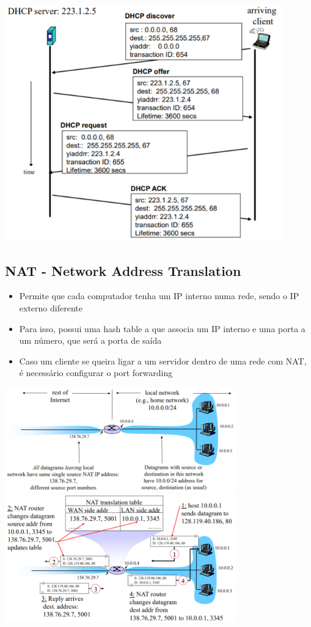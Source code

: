 \documentclass[../resumosRCOM.tex]{subfiles}
\begin{document}
\begin{center}
    \includegraphics[width=12cm]{images/RCOM26.png}
\end{center}

\subsection{NAT - Network Address Translation}
\begin{itemize}
    \item Permite que cada computador tenha um IP interno numa rede, sendo o IP externo diferente
    \item Para isso, possui uma hash table a que associa um IP interno e uma porta a um número, que será a porta de saída
    \item Caso um cliente se queira ligar a um servidor dentro de uma rede com NAT, é necessário configurar o port forwarding

\end{itemize}
\begin{center}
    \includegraphics[width=10cm]{images/RCOM27.png}
    \includegraphics[width=10cm]{images/RCOM28.png}
\end{center}
\end{document}
